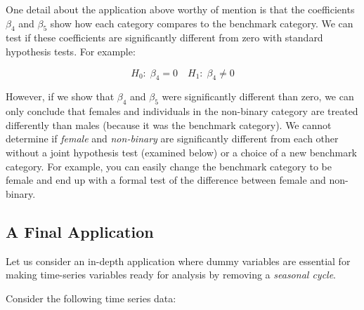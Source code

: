 \documentclass[
]{book}
\begin{document}
One detail about the application above worthy of mention is that the coefficients \(\beta_4\) and \(\beta_5\) show how each category compares to the benchmark category. We can test if these coefficients are significantly different from zero with standard hypothesis tests. For example:

\[H_0: \; \beta_4 = 0 \quad H_1: \; \beta_4 \neq 0\]

However, if we show that \(\beta_4\) and \(\beta_5\) were significantly different than zero, we can only conclude that females and individuals in the non-binary category are treated differently than males (because it was the benchmark category). We cannot determine if \emph{female} and \emph{non-binary} are significantly different from each other without a joint hypothesis test (examined below) or a choice of a new benchmark category. For example, you can easily change the benchmark category to be female and end up with a formal test of the difference between female and non-binary.

\hypertarget{a-final-application}{%
\subsection{A Final Application}\label{a-final-application}}

Let us consider an in-depth application where dummy variables are essential for making time-series variables ready for analysis by removing a \emph{seasonal cycle}.

Consider the following time series data:
\end{document}
